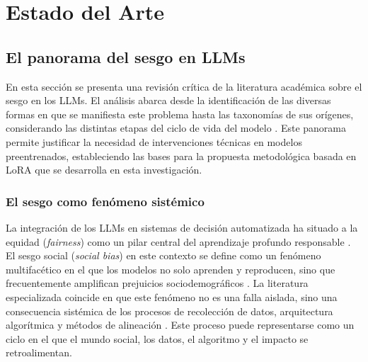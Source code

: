 \documentclass[12pt,a4paper]{report}
\begin{document}
\chapter{Estado del Arte}
\label{chap:estado_del_arte}

\section{El panorama del sesgo en LLMs}
\label{sec:estado_del_arte}

En esta sección se presenta una revisión crítica de la literatura académica sobre el sesgo en los LLMs. El análisis abarca desde la identificación de las diversas formas en que se manifiesta este problema hasta las taxonomías de sus orígenes, considerando las distintas etapas del ciclo de vida del modelo \cite{shah_comprehensive_2025, guo_bias_2024}. Este panorama permite justificar la necesidad de intervenciones técnicas en modelos preentrenados, estableciendo las bases para la propuesta metodológica basada en LoRA que se desarrolla en esta investigación.

\subsection{El sesgo como fenómeno sistémico}
\label{subsec:sesgo_fenomeno_sistemico}

La integración de los LLMs en sistemas de decisión automatizada ha situado a la equidad (\textit{fairness}) como un pilar central del aprendizaje profundo responsable \cite{shah_comprehensive_2025}. El sesgo social (\textit{social bias}) en este contexto se define como un fenómeno multifacético en el que los modelos no solo aprenden y reproducen, sino que frecuentemente amplifican prejuicios sociodemográficos \cite{guo_bias_2024}. La literatura especializada coincide en que este fenómeno no es una falla aislada, sino una consecuencia sistémica de los procesos de recolección de datos, arquitectura algorítmica y métodos de alineación \cite{shah_comprehensive_2025, guo_bias_2024}. Este proceso puede representarse como un ciclo en el que el mundo social, los datos, el algoritmo y el impacto se retroalimentan.
\end{document}
